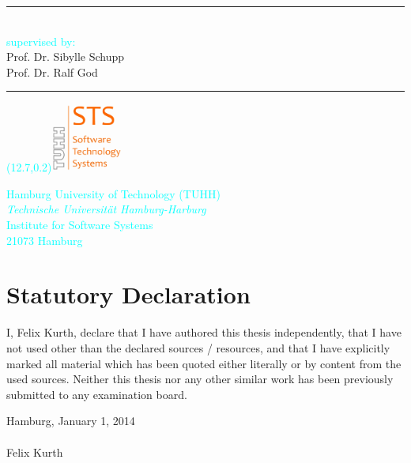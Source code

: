 \documentclass[twoside, english,numbers=noenddot, abstracton, headsepline, openright]{scrreprt}
\begin{document}
\noindent \begin{flushleft}
\textsf{\vspace{16mm}
}\textcolor{cyan}{\rule[0.5ex]{1\columnwidth}{0.5pt}}\\
\textsf{\textcolor{cyan}{\large supervised by:}}\textsf{}\\
\textsf{Prof. Dr. Sibylle Schupp}\\
\textsf{Prof. Dr. Ralf God}\textcolor{cyan}{}\\
\textcolor{cyan}{\rule[0.5ex]{1\columnwidth}{0.5pt}\begin{textblock}{3}(12.7,0.2)\includegraphics[width=23mm,height=23mm]{pics/STS-Logo}\end{textblock}}\textsf{\textcolor{cyan}{Hamburg University of Technology (TUHH)}}\\
\textsf{\textcolor{cyan}{\textit{Technische Universit{\"a}t Hamburg-Harburg}}}\\
\textsf{\textcolor{cyan}{Institute for Software Systems}}\\
\textsf{\textcolor{cyan}{21073 Hamburg}}
\par\end{flushleft}


\cleardoublepage
\chapter*{Statutory Declaration}
I, Felix Kurth, declare that I have authored this thesis independently, that I
have not used other than the declared sources / resources, and that I have
explicitly marked all material which has been quoted either literally or by
content from the used sources. Neither this thesis nor any other similar
work has been previously submitted to any examination board.
\hspace{3cm}
\begin{flushright}
Hamburg, January 1, 2014 \\ 
\vspace{0.5cm}
 \dotuline{\hspace{5cm}}
 \\ 
Felix Kurth
\end{flushright}
\cleardoublepage%
\end{document}

